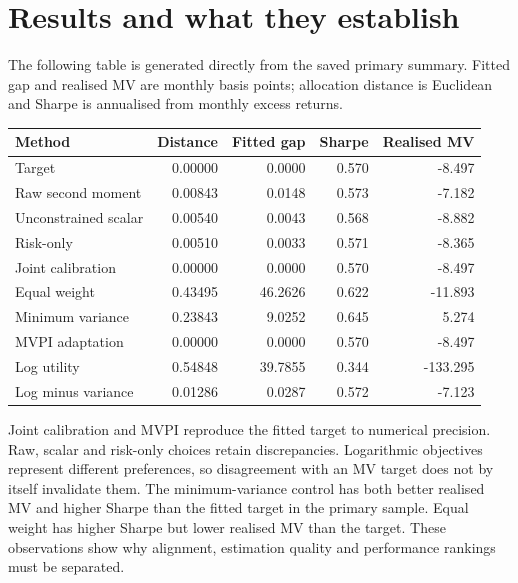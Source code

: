 \documentclass[11pt,a4paper]{article}
\begin{document}
\section{Results and what they establish}
The following table is generated directly from the saved primary summary. Fitted gap and realised MV are monthly basis points; allocation distance is Euclidean and Sharpe is annualised from monthly excess returns.
\begin{center}\small
\begin{tabular}{lrrrr}\toprule
Method & Distance & Fitted gap & Sharpe & Realised MV\\\midrule
Target & 0.00000 & 0.0000 & 0.570 & -8.497 \\
Raw second moment & 0.00843 & 0.0148 & 0.573 & -7.182 \\
Unconstrained scalar & 0.00540 & 0.0043 & 0.568 & -8.882 \\
Risk-only & 0.00510 & 0.0033 & 0.571 & -8.365 \\
Joint calibration & 0.00000 & 0.0000 & 0.570 & -8.497 \\
Equal weight & 0.43495 & 46.2626 & 0.622 & -11.893 \\
Minimum variance & 0.23843 & 9.0252 & 0.645 & 5.274 \\
MVPI adaptation & 0.00000 & 0.0000 & 0.570 & -8.497 \\
Log utility & 0.54848 & 39.7855 & 0.344 & -133.295 \\
Log minus variance & 0.01286 & 0.0287 & 0.572 & -7.123 \\
\bottomrule\end{tabular}\end{center}
Joint calibration and MVPI reproduce the fitted target to numerical precision. Raw, scalar and risk-only choices retain discrepancies. Logarithmic objectives represent different preferences, so disagreement with an MV target does not by itself invalidate them. The minimum-variance control has both better realised MV and higher Sharpe than the fitted target in the primary sample. Equal weight has higher Sharpe but lower realised MV than the target. These observations show why alignment, estimation quality and performance rankings must be separated.
\end{document}
